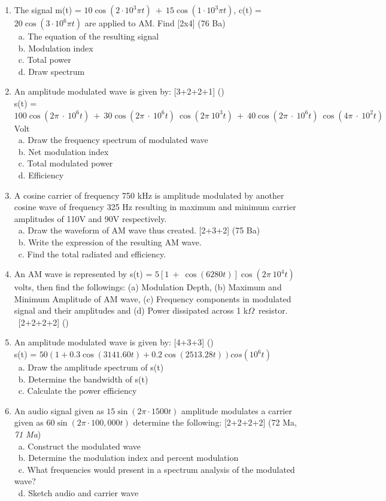 \documentclass[12pt]{article}
\newcommand{\W}{\(\Omega\)}
\newcommand{\enter}{\\\textcolor{white}{1}}
\begin{document}
\begin{enumerate}
      \item The signal m(t) = $10\cos(2\cdot 10^3\pi t)\ +\ 15\cos(1\cdot 10^3\pi t)$, c(t) = $20\cos(3\cdot 10^6\pi t)$ are applied to AM. Find \hfill [2x4] (76 Ba)
      \enter a. The equation of the resulting signal
      \enter b. Modulation index
      \enter c. Total power
      \enter d. Draw spectrum

      \item An amplitude modulated wave is given by: \hfill [3+2+2+1] ()\\
      s(t) = $100\cos(2\pi\ \cdot\ 10^6t)\ +\ 30\cos(2\pi\ \cdot\ 10^6t)\ \cos(2\pi\ 10^3t)\ +\ 40\cos(2\pi\ \cdot\ 10^6 t)\ \cos(4\pi\ \cdot\ 10^2t)$ Volt
      \enter a. Draw the frequency spectrum of modulated wave
      \enter b. Net modulation index
      \enter c. Total modulated power
      \enter d. Efficiency

      \item A cosine carrier of frequency 750 kHz is amplitude modulated by another cosine wave of frequency 325 Hz resulting in maximum and minimum carrier amplitudes of 110V and 90V respectively.
      \enter a. Draw the waveform of AM wave thus created. \hfill [2+3+2] (75 Ba)
      \enter b. Write the expression of the resulting AM wave.
      \enter c. Find the total radiated and efficiency.

      \item An AM wave is represented by s(t) = $5 \left[ 1\ +\ \cos(6280t) \right] \cos(2\pi\ 10^4t)$ volts, then find the followings: (a) Modulation Depth, (b) Maximum and Minimum Amplitude of AM wave, (c) Frequency components in modulated signal and their amplitudes and (d) Power dissipated across 1 k\W\ resistor.
      \enter\hfill [2+2+2+2] ()

      \item An amplitude modulated wave is given by: \hfill [4+3+3] ()\\
      s(t) = $50 (1 + 0.3\cos(3141.60t) + 0.2\cos(2513.28t))cos(10^6t)$
      \enter a. Draw the amplitude spectrum of s(t)
      \enter b. Determine the bandwidth of s(t)
      \enter c. Calculate the power efficiency

      \item An audio signal given as $15 \sin(2\pi \cdot 1500t)$ amplitude modulates a carrier given as $60 \sin(2\pi \cdot 100,000t)$ determine the following: \hfill [2+2+2+2] (72 Ma, \textit{71 Ma})
      \enter a. Construct the modulated wave
      \enter b. Determine the modulation index and percent modulation
      \enter c. What frequencies would present in a spectrum analysis of the modulated wave?
      \enter d. Sketch audio and carrier wave


\end{enumerate}
\end{document}
